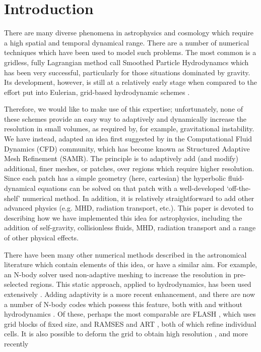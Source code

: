 
\section{Introduction}\label{sec.intro}


There are many diverse phenomena in astrophysics and cosmology which require a high spatial and temporal dynamical range. There are a number of numerical techniques which have been used to
model such problems.  The most common is a gridless, fully Lagrangian method call Smoothed Particle Hydrodynamcs \citep[SPH;][]{Lucy77, SPH} which has been very successful, particularly for those situations dominated by gravity.  Its development, however, is still at a relatively early stage when
compared to the effort put into Eulerian, grid-based hydrodynamic schemes \citep[e.g.,][]{Woodward84}. 

Therefore, we would like to make use of this expertise; unfortunately, none of these schemes provide an easy way to adaptively and dynamically increase the resolution in small volumes, as required by, for example, gravitational instability.  We have instead, adapted an idea first suggested by \citet{Berger89} in the Computational Fluid Dynamics (CFD) community, which has become known as Structured Adaptive Mesh Refinement (SAMR).  The principle is to adaptively add (and modify) additional, finer meshes, or patches, over regions which require higher resolution.  Since each patch has a simple geometry (here, cartesian) the hyperbolic fluid-dynamical equations can be solved on that patch with a well-developed `off-the-shelf' numerical method.  In addition, it is relatively straightforward to add other advanced physics (e.g. MHD, radiation transport, etc.). This paper is devoted to describing how we have implemented this idea for astrophysics, including the addition of self-gravity, collisionless fluids, MHD, radiation transport and a range of other physical effects.

There have been many other numerical methods described in the astronomical literature which contain elements of this idea, or have a similar aim.  For example, an N-body solver \cite{Villumsen89} used non-adaptive meshing to increase the resolution in pre-selected regions.  This static approach, applied to hydrodynamics, has been used extensively \citep[e.g.,]{Ruffert94, Anninos94}.  Adding adaptivity is a more recent enhancement, and there are now a number of N-body codes which possess this feature, both with and without  hydrodynamics  \cite{Couchman91, Jessop94, Suisalu95, Splinter96, Gelato97, ART97, Truelove98, flash_method, MLAPM01,  Yahagi01, RAMSES, Quilis04, Ziegler05, Zhang06}.  Of these, perhaps the most comparable are FLASH \citep{flash_method}, which uses grid blocks of fixed size, and RAMSES \citep{RAMSES} and ART \citep{ART97}, both of which refine individual cells.  It is also possible to deform the grid to obtain high resolution \citep[e.g.,][]{Gnedin95, Xu97, Pen98}, and more recently 

